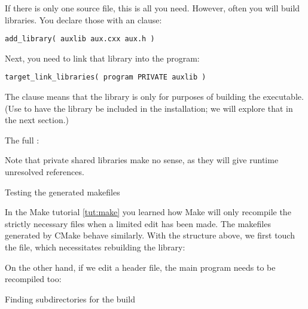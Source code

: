 \begin{floatingfigure}[r]{2.5in}
  \begin{minipage}{2.5in}
  \end{minipage}
\end{floatingfigure}
%
If there is only one source file, this is all you need.
However, often you will build libraries.
You declare those with an  clause:
\begin{lstlisting}
add_library( auxlib aux.cxx aux.h )
\end{lstlisting}
Next, you need to link that library into the program:
\begin{lstlisting}
target_link_libraries( program PRIVATE auxlib )
\end{lstlisting}
The  clause means that the library is only for
purposes of building the executable.
(Use  to have the library be included in the installation;
we will explore that in the next section.)

The full :
%


Note that private shared libraries make no sense, as they will give
runtime unresolved references.

 {Testing the generated makefiles}

In the Make tutorial \ref{tut:make} you learned how Make will only recompile
the strictly necessary files when a limited edit has been made.
The makefiles generated by CMake behave similarly.
With the structure above, we first touch the  file,
which necessitates rebuilding the library:
%


On the other hand, if we edit a header file, the main program
needs to be recompiled too:
%


\newpage
{} {Finding subdirectories for the build}

